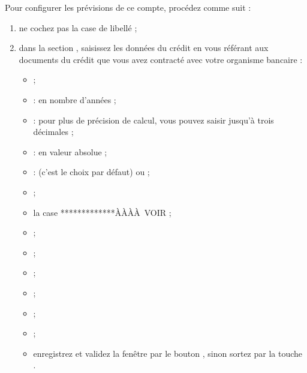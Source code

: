 Pour configurer les prévisions de ce compte, procédez comme suit :

\begin{enumerate}
	\item ne cochez pas la case de libellé  ; %
	\item dans la section , saisissez les données du crédit en vous référant aux documents du crédit que vous avez contracté avec votre organisme bancaire :
		\begin{itemize}
			 \item {} ; 
			 \item {} : en nombre d'années ;
			 \item {} : pour plus de précision de calcul, vous pouvez saisir jusqu'à trois décimales ;
			 \item {} : en valeur absolue ;
			 \item {} :  (c'est le choix par défaut) ou  ;
			 \item {} ;
			 \item la case *****ÀÀÀÀ VOIR ;
			 \item {} ;
			 \item {} ;
			 \item {} ;
			 \item {} ;
			 \item {} ;
			 \item {} ;
			 
			 		 
			 \item enregistrez et validez la fenêtre par le bouton , sinon sortez par la touche .
		\end{itemize}
\end{enumerate}


